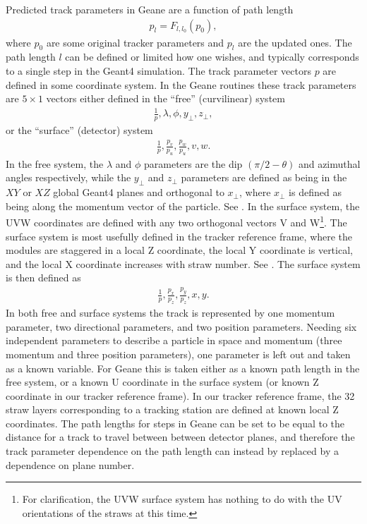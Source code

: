 Predicted track parameters in Geane are a function of path length 
        \begin{align} \label{eq:pp}
            p_{l} = F_{l,l_{0}}(p_{0}),
        \end{align}
where $p_{0}$ are some original tracker parameters and $p_{l}$ are the updated ones. The path length $l$ can be defined or limited how one wishes, and typically corresponds to a single step in the Geant4 simulation. The track parameter vectors $p$ are defined in some coordinate system. In the Geane routines these track parameters are $5 \times 1$ vectors either defined in the ``free'' (curvilinear) system
        \begin{align}
            \frac{1}{p}, \lambda, \phi, y_{\perp}, z_{\perp},
        \end{align}
or the ``surface'' (detector) system 
        \begin{align} \label{eq:UVW}
            \frac{1}{p}, \frac{p_{v}}{p_{u}}, \frac{p_{w}}{p_{u}}, v, w.
        \end{align}
In the free system, the $\lambda$ and $\phi$ parameters are the dip $(\pi/2 - \theta)$ and azimuthal angles respectively, while the $y_{\perp}$ and $z_{\perp}$ parameters are defined as being in the $XY$ or $XZ$ global Geant4 planes and orthogonal to $x_{\perp}$, where $x_{\perp}$ is defined as being along the momentum vector of the particle. See . In the surface system, the UVW coordinates are defined with any two orthogonal vectors V and W\footnote{For clarification, the UVW surface system has nothing to do with the UV orientations of the straws at this time.}. The surface system is most usefully defined in the tracker reference frame, where the modules are staggered in a local Z coordinate, the local Y coordinate is vertical, and the local X coordinate increases with straw number. See . The surface system is then defined as
        \begin{align}
            \frac{1}{p}, \frac{p_{x}}{p_{z}}, \frac{p_{y}}{p_{z}}, x, y.
        \end{align}
In both free and surface systems the track is represented by one momentum parameter, two directional parameters, and two position parameters. Needing six independent parameters to describe a particle in space and momentum (three momentum and three position parameters), one parameter is left out and taken as a known variable. For Geane this is taken either as a known path length in the free system, or a known U coordinate in the surface system (or known Z coordinate in our tracker reference frame). In our tracker reference frame, the 32 straw layers corresponding to a tracking station are defined at known local Z coordinates. The path lengths for steps in Geane can be set to be equal to the distance for a track to travel between between detector planes, and therefore the track parameter dependence on the path length can instead by replaced by a dependence on plane number.

